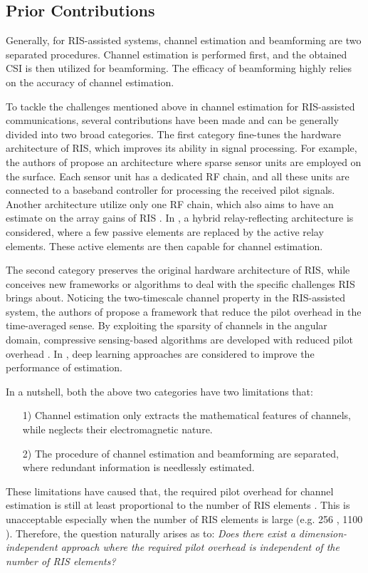 \documentclass[12pt,draftclsnofoot,journal,onecolumn]{IEEEtran}
\theoremstyle{nonumberplain}
\begin{document}
\subsection{Prior Contributions}
\label{Prior Contributions}

Generally, for RIS-assisted systems, channel estimation and beamforming are two separated procedures.
Channel estimation is performed first, and the obtained \ac{CSI} is then utilized for beamforming.
The efficacy of beamforming highly relies on the accuracy of channel estimation.

To tackle the challenges mentioned above in channel estimation for RIS-assisted communications, several contributions have been made and can be generally divided into two broad categories.
The first category fine-tunes the hardware architecture of RIS, which improves its ability in signal processing.
For example, the authors of \cite{taha2021enabling} propose an architecture where sparse sensor units are employed on the surface.
Each sensor unit has a dedicated \ac{RF} chain, and all these units are connected to a baseband controller for processing the received pilot signals.
Another architecture utilize only one \ac{RF} chain, which also aims to have an estimate on the array gains of RIS \cite{alexandropoulos2020hardware}.
In \cite{nguyen2021hybrid}, a hybrid relay-reflecting architecture is considered, where a few passive elements are replaced by the active relay elements.
These active elements are then capable for channel estimation.

The second category preserves the original hardware architecture of RIS, while conceives new frameworks or algorithms to deal with the specific challenges RIS brings about.
Noticing the two-timescale channel property in the RIS-assisted system, the authors of \cite{Huchen} propose a framework that reduce the pilot overhead in the time-averaged sense.
By exploiting the sparsity of channels in the angular domain, compressive sensing-based algorithms are developed with reduced pilot overhead \cite{wang2020compressed}.
In \cite{kundu2021channel}, deep learning approaches are considered to improve the performance of estimation.

In a nutshell, both the above two categories have two limitations that:
\begin{enumerate}
\item[1)]  Channel estimation only extracts the mathematical features of channels, while neglects their electromagnetic nature.
\item[2)] The procedure of channel estimation and beamforming are separated, where redundant information is needlessly estimated.
\end{enumerate}
These limitations have caused that, the required pilot overhead for channel estimation is still at least proportional to the number of RIS elements \cite{taha2021enabling,alexandropoulos2020hardware,nguyen2021hybrid,Huchen,wang2020compressed,kundu2021channel}.
This is unacceptable especially when the number of RIS elements is large (e.g. 256 \cite{dai2020reconfigurable}, 1100 \cite{pei2021ris}).
Therefore, the question naturally arises as to: {\it Does there exist a dimension-independent approach where the required pilot overhead is independent of the number of RIS elements?}
\end{document}
